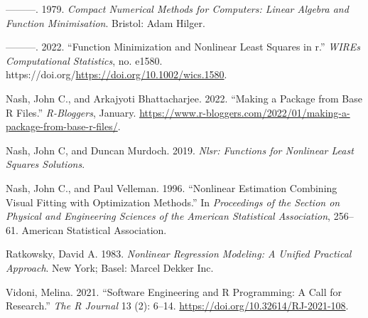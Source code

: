 \documentclass[
]{article}
\newlength{\cslhangindent}
\newlength{\cslentryspacingunit} %
\newenvironment{CSLReferences}[2] %
 {%
  \setlength{\parindent}{0pt}
  \ifodd #1
  \let\oldpar\par
  \def\par{\hangindent=\cslhangindent\oldpar}
  \fi
  \setlength{\parskip}{#2\cslentryspacingunit}
 }%
 {}
\begin{document}
\begin{CSLReferences}{1}{0}
\leavevmode{}%
---------. 1979. \emph{Compact Numerical Methods for Computers: Linear
Algebra and Function Minimisation}. Bristol: Adam Hilger.

\leavevmode{}%
---------. 2022. {``Function Minimization and Nonlinear Least Squares in
r.''} \emph{WIREs Computational Statistics}, no. e1580.
https://doi.org/\url{https://doi.org/10.1002/wics.1580}.

\leavevmode{}%
Nash, John C., and Arkajyoti Bhattacharjee. 2022. {``Making a Package
from Base {R} Files.''} \emph{R-Bloggers}, January.
\url{https://www.r-bloggers.com/2022/01/making-a-package-from-base-r-files/}.

\leavevmode{}%
Nash, John C, and Duncan Murdoch. 2019. \emph{Nlsr: Functions for
Nonlinear Least Squares Solutions}.

\leavevmode{}%
Nash, John C., and Paul Velleman. 1996. {``Nonlinear Estimation
Combining Visual Fitting with Optimization Methods.''} In
\emph{Proceedings of the Section on Physical and Engineering Sciences of
the American Statistical Association}, 256--61. American Statistical
Association.

\leavevmode{}%
Ratkowsky, David A. 1983. \emph{Nonlinear Regression Modeling: A Unified
Practical Approach}. New York; Basel: Marcel Dekker Inc.

\leavevmode{}%
Vidoni, Melina. 2021. {``{Software Engineering and R Programming: A Call
for Research}.''} \emph{{The R Journal}} 13 (2): 6--14.
\url{https://doi.org/10.32614/RJ-2021-108}.

\end{CSLReferences}
\end{document}
